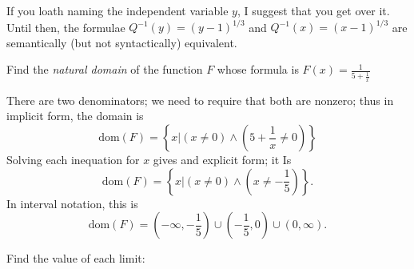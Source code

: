 \documentclass[12pt, answers,fleqn]{exam}
\newcommand{\dom}{\mbox{dom}}
\begin{document}
\begin{questions}
\begin{solution}
    \quad If you loath naming the independent  variable $y$, I
    suggest that you get over it. Until then, the formulae 
    $Q^{-1}(y) = (y-1)^{1/3}$ and $Q^{-1}(x) = (x-1)^{1/3}$
    are semantically (but not syntactically) equivalent.
\end{solution}
    \question   Find the \emph{natural domain} of the function $F$ whose
formula is $F(x) = \frac{1}{5+ \frac{1}{x}}$
\begin{solution}%
    There are two denominators; we need to require that both are nonzero; thus
    in implicit form, the domain is
    \[
        \dom(F) = \left \{ x | (x \neq 0) \land (5+ \frac{1}{x} \neq 0) \right \}
    \]
    Solving each inequation for $x$ gives and explicit form; it Is
    \[
        \dom(F) = \left \{ x | (x \neq 0) \land (x  \neq -\frac{1}{5}) \right \}.
    \]
    In interval notation, this is
    \[   \dom(F) = (-\infty, -\frac{1}{5}) \cup (-\frac{1}{5},0) \cup
          (0, \infty).
        \]
\end{solution}



\question Find the value of each limit:

\end{questions}
\end{document}
